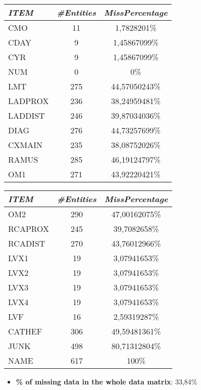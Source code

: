 \documentclass[a4paper,12pt]{article}
\begin{document}
        \begin{multicols}{2}
            
            \begin{tabular}{|l|c|c|} \hline

                \textit{ITEM} & \textit{\#Entities}	& \textit{MissPercentage} \\
                \hline CMO	&11&	1,7828201\% \\
                \hline CDAY	&9&	1,45867099\% \\
                \hline CYR	&9&	1,45867099\% \\
                \hline NUM	&0&	0\% \\
                \hline LMT	&275&	44,57050243\% \\
                \hline LADPROX&	236&	38,24959481\% \\
                \hline LADDIST&	246&	39,87034036\% \\
                \hline DIAG	&276	&44,73257699\% \\
                \hline CXMAIN&	235	&38,08752026\% \\
                \hline RAMUS	&285	&46,19124797\% \\
                \hline OM1	&271	&43,92220421\% \\ \hline
            \end{tabular}
            
            \begin{tabular}{|l|c|c|} \hline

                \textit{ITEM} & \textit{\#Entities}	& \textit{MissPercentage} \\
                \hline OM2	&290	&47,00162075\% \\
                \hline RCAPROX&	245&	39,7082658\% \\
                \hline RCADIST&	270&	43,76012966\% \\
                \hline LVX1	&19&	3,07941653\% \\
                \hline LVX2	&19	&3,07941653\% \\
                \hline LVX3	&19&	3,07941653\% \\
                \hline LVX4	&19&	3,07941653\% \\
                \hline LVF	&16&	2,59319287\% \\
                \hline CATHEF&	306&	49,59481361\% \\
                \hline JUNK	&498	&80,71312804\% \\
                \hline NAME	&617	&100\% \\ \hline
                
            \end{tabular}
	\end{multicols}
    
    \begin{itemize}
        \item \textbf{\% of missing data in the whole data matrix}: 33,84\%

    \end{itemize}
    
\end{document}
